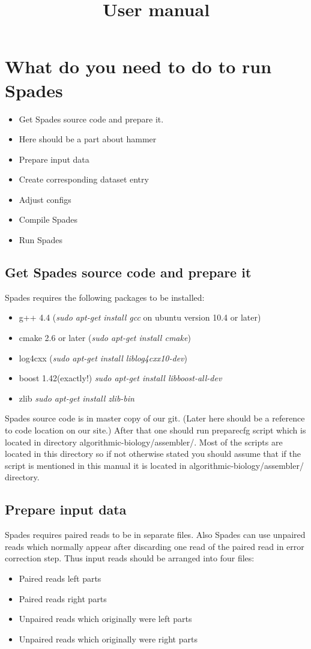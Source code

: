 \documentclass[a4paper,10pt]{article}
\title{User manual}
\begin{document}
\maketitle

\section{What do you need to do to run Spades}
\begin{itemize}
\item Get Spades source code and prepare it.
\item Here should be a part about hammer
\item Prepare input data
\item Create corresponding dataset entry
\item Adjust configs
\item Compile Spades
\item Run Spades
\end{itemize}

\subsection{Get Spades source code and prepare it}
Spades requires the following packages to be installed:
\begin{itemize}
\item g++ 4.4 ({\it sudo apt-get install gcc} on ubuntu version 10.4 or later)
\item cmake 2.6 or later ({\it sudo apt-get install cmake})
\item log4cxx ({\it sudo apt-get install liblog4cxx10-dev})
\item boost 1.42(exactly!) {\it sudo apt-get install libboost-all-dev} 
\item zlib {\it sudo apt-get install zlib-bin} 
\end{itemize}

Spades source code is in master copy of our git.
(Later here should be a reference to code location on our site.)
After that one should run preparecfg script which is located in directory algorithmic-biology/assembler/.
Most of the scripts are located in this directory so if not otherwise stated you should assume that if the script is mentioned in this manual it is located in algorithmic-biology/assembler/ directory.

\subsection{Prepare input data}
Spades requires paired reads to be in separate files.
Also Spades can use unpaired reads which normally appear after discarding one read of the paired read in error correction step.
Thus input reads should be arranged into four files:
\begin{itemize}
 \item Paired reads left parts
 \item Paired reads right parts
 \item Unpaired reads which originally were left parts
 \item Unpaired reads which originally were right parts
\end{itemize}
\end{document}

